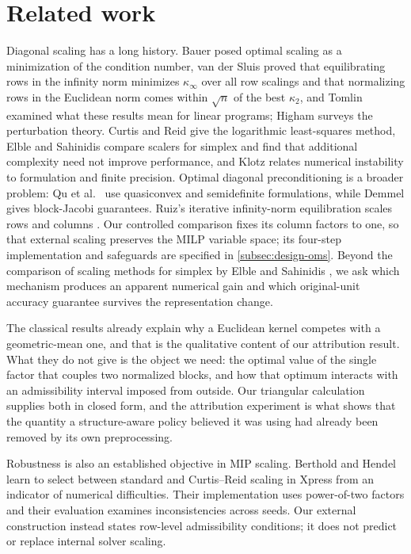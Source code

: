 \section{Related work}
\label{sec:related}
Diagonal scaling has a long history. Bauer \cite{bauer1963scaled} posed optimal scaling
as a minimization of the condition number, van der Sluis \cite{vandersluis1969condition}
proved that equilibrating rows in the infinity norm minimizes $\kappa_\infty$ over all row
scalings and that normalizing rows in the Euclidean norm comes within $\sqrt{n}$ of the best
$\kappa_2$, and Tomlin \cite{tomlin1975scaling} examined what these results mean for linear
programs; Higham \cite[Ch.~9]{higham2002accuracy} surveys the perturbation theory. Curtis and
Reid \cite{curtis1972scaling} give the logarithmic least-squares method, Elble and Sahinidis
\cite{elble2012scaling} compare scalers for simplex and find that additional complexity need
not improve performance, and Klotz \cite{klotz2014numerics} relates numerical instability to
formulation and finite precision. Optimal diagonal preconditioning is a broader problem: Qu et
al.\ \cite{qu2024diagonal} use quasiconvex and semidefinite formulations, while Demmel
\cite{demmel2023block} gives block-Jacobi guarantees.
Ruiz's iterative infinity-norm equilibration scales rows and columns
\cite{ruiz2001scaling}. Our controlled comparison fixes its column factors to one,
so that external scaling preserves the MILP variable space; its four-step implementation
and safeguards are specified in \cref{subsec:design-oms}.
Beyond the comparison of scaling methods for simplex by Elble and Sahinidis
\cite{elble2012scaling}, we ask which mechanism produces an apparent numerical gain and
which original-unit accuracy guarantee survives the representation change.

The classical results already explain why a Euclidean kernel competes with a geometric-mean one,
and that is the qualitative content of our attribution result. What they do not give is the
object we need: the optimal value of the single factor that couples two normalized blocks, and
how that optimum interacts with an admissibility interval imposed from outside. Our triangular
calculation supplies both in closed form, and the attribution experiment is what shows that the
quantity a structure-aware policy believed it was using had already been removed by its own
preprocessing.

Robustness is also an established objective in MIP scaling. Berthold and Hendel
\cite{berthold2021scaling} learn to select between standard and Curtis--Reid scaling
in Xpress from an indicator of numerical difficulties. Their implementation uses
power-of-two factors and their evaluation examines inconsistencies across seeds.
Our external construction instead states row-level admissibility conditions; it does
not predict or replace internal solver scaling.

